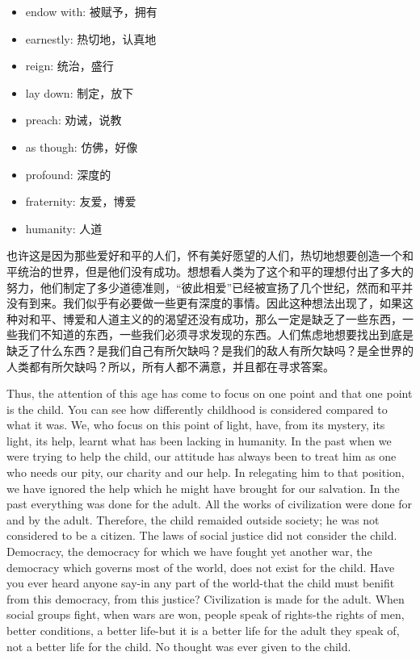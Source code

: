 \documentclass[lang=cn,10pt]{elegantbook}
\begin{document}
\begin{tcolorbox}
    \begin{itemize}
        \item endow with: 被赋予，拥有
        \item earnestly: 热切地，认真地
        \item reign: 统治，盛行
        \item lay down: 制定，放下
        \item preach: 劝诫，说教
        \item as though: 仿佛，好像
        \item profound: 深度的
        \item fraternity: 友爱，博爱
        \item humanity: 人道
    \end{itemize}
\end{tcolorbox}

也许这是因为那些爱好和平的人们，怀有美好愿望的人们，热切地想要创造一个和平统治的世界，但是他们没有成功。想想看人类为了这个和平的理想付出了多大的努力，他们制定了多少道德准则，“彼此相爱”已经被宣扬了几个世纪，然而和平并没有到来。我们似乎有必要做一些更有深度的事情。因此这种想法出现了，如果这种对和平、博爱和人道主义的的渴望还没有成功，那么一定是缺乏了一些东西，一些我们不知道的东西，一些我们必须寻求发现的东西。人们焦虑地想要找出到底是缺乏了什么东西？是我们自己有所欠缺吗？是我们的敌人有所欠缺吗？是全世界的人类都有所欠缺吗？所以，所有人都不满意，并且都在寻求答案。

Thus, the attention of this age has come to focus on one point and that one point is the child. You can see how differently childhood is considered compared to what it was. We, who focus on this point of light, have, from its mystery, its light, its help, learnt what has been lacking in humanity. In the past when we were trying to help the child, our attitude has always been to treat him as one who needs our pity, our charity and our help. In relegating him to that position, we have ignored the help which he might have brought for our salvation. In the past everything was done for the adult. All the works of civilization were done for and by the adult. Therefore, the child remaided outside society; he was not considered to be a citizen. The laws of social justice did not consider the child. Democracy, the democracy for which we have fought yet another war, the democracy which governs most of the world, does not exist for the child. Have you ever heard anyone say-in any part of the world-that the child must benifit from this democracy, from this justice? Civilization is made for the adult. When social groups fight, when wars are won, people speak of rights-the rights of men, better conditions, a better life-but it is a better life for the adult they speak of, not a better life for the child. No thought was ever given to the child.
\end{document}
